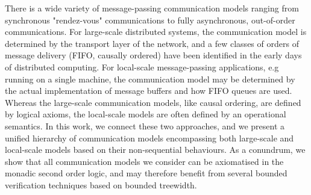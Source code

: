 There is a wide variety of message-passing communication models ranging from synchronous "rendez-vous" 
communications to fully asynchronous, out-of-order communications. For large-scale distributed systems, the
communication model is determined by the transport layer of the network, and a few classes of 
orders of message delivery (FIFO, causally ordered) have been identified in the early days of 
distributed computing. For local-scale message-passing applications, 
e.g running on a single machine, the communication model may be determined by the actual implementation of 
message buffers and how FIFO queues are used. Whereas the large-scale communication
models, like causal ordering, are defined by logical axioms, the local-scale models are often defined by an operational
semantics. In this work, we connect these two approaches, and we present a unified hierarchy of communication
models encompassing both large-scale and local-scale models based on their non-sequential behaviours.
As a conundrum, we show that all communication models we consider can be axiomatised in the monadic second order logic,
and may therefore benefit from several bounded verification techniques based on bounded treewidth.